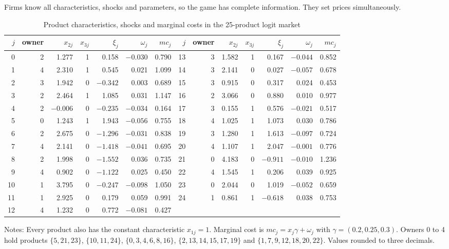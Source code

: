 Firms know all characteristics, shocks and parameters, so the game has complete information. They set prices
simultaneously.

\begin{table}[htbp]
\centering
\caption{Product characteristics, shocks and marginal costs in the 25-product logit market}
\label{tab:C-logit-data}
\footnotesize
\setlength{\tabcolsep}{4pt}
\begin{tabular}{@{}rrrrrrr@{\hspace{14pt}}rrrrrrr@{}}
\toprule
$j$ & owner & $x_{2j}$ & $x_{3j}$ & $\xi_j$ & $\omega_j$ & $mc_j$ &
$j$ & owner & $x_{2j}$ & $x_{3j}$ & $\xi_j$ & $\omega_j$ & $mc_j$ \\
\midrule
0 & 2 & 1.277 & 1 & 0.158 & $-0.030$ & 0.790 & 13 & 3 & 1.582 & 1 & 0.167 & $-0.044$ & 0.852 \\
1 & 4 & 2.310 & 1 & 0.545 & 0.021 & 1.099 & 14 & 3 & 2.141 & 0 & 0.027 & $-0.057$ & 0.678 \\
2 & 3 & 1.942 & 0 & $-0.342$ & 0.003 & 0.689 & 15 & 3 & 0.915 & 0 & 0.317 & 0.024 & 0.453 \\
3 & 2 & 2.464 & 1 & 1.085 & 0.031 & 1.147 & 16 & 2 & 3.066 & 0 & 0.880 & 0.010 & 0.977 \\
4 & 2 & $-0.006$ & 0 & $-0.235$ & $-0.034$ & 0.164 & 17 & 3 & 0.155 & 1 & 0.576 & $-0.021$ & 0.517 \\
5 & 0 & 1.243 & 1 & 1.943 & $-0.056$ & 0.755 & 18 & 4 & 1.025 & 1 & 1.073 & 0.030 & 0.786 \\
6 & 2 & 2.675 & 0 & $-1.296$ & $-0.031$ & 0.838 & 19 & 3 & 1.280 & 1 & 1.613 & $-0.097$ & 0.724 \\
7 & 4 & 2.141 & 0 & $-1.418$ & $-0.041$ & 0.695 & 20 & 4 & 1.107 & 1 & 2.047 & $-0.001$ & 0.776 \\
8 & 2 & 1.998 & 0 & $-1.552$ & 0.036 & 0.735 & 21 & 0 & 4.183 & 0 & $-0.911$ & $-0.010$ & 1.236 \\
9 & 4 & 0.902 & 0 & $-1.122$ & 0.025 & 0.450 & 22 & 4 & 1.545 & 1 & 0.206 & 0.039 & 0.925 \\
10 & 1 & 3.795 & 0 & $-0.247$ & $-0.098$ & 1.050 & 23 & 0 & 2.044 & 0 & 1.019 & $-0.052$ & 0.659 \\
11 & 1 & 2.925 & 0 & 0.179 & 0.059 & 0.991 & 24 & 1 & 0.861 & 1 & $-0.618$ & 0.038 & 0.753 \\
12 & 4 & 1.232 & 0 & 0.772 & $-0.081$ & 0.427 & & & & & & & \\
\bottomrule
\end{tabular}

\vspace{3pt}
\begin{minipage}{0.97\textwidth}
\footnotesize Notes: Every product also has the constant characteristic $x_{1j} = 1$. Marginal cost is
$mc_j = x_j\gamma + \omega_j$ with $\gamma = (0.2, 0.25, 0.3)$. Owners 0 to 4 hold products $\{5, 21, 23\}$,
$\{10, 11, 24\}$, $\{0, 3, 4, 6, 8, 16\}$, $\{2, 13, 14, 15, 17, 19\}$ and $\{1, 7, 9, 12, 18, 20, 22\}$. Values
rounded to three decimals.
\end{minipage}
\end{table}

